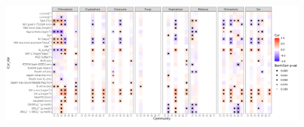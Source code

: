 \documentclass[12pt]{article}
\numberwithin{equation}{section}
\begin{document}
\begin{landscape}
    \begin{figure}
        \centering
        \includegraphics[width=0.95\columnwidth]{si-figures/bygroup.png}
        \caption{}
        \label{fig:network-bygroup}
    \end{figure}
\end{landscape}




\end{document}
